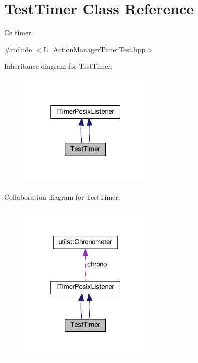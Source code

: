 \hypertarget{classTestTimer}{}\section{Test\+Timer Class Reference}
\label{classTestTimer}


Ce timer.  




{\ttfamily \#include $<$L\+\_\+\+Action\+Manager\+Timer\+Test.\+hpp$>$}



Inheritance diagram for Test\+Timer\+:
\nopagebreak
\begin{figure}[H]
\begin{center}
\leavevmode
\includegraphics[width=184pt]{classTestTimer__inherit__graph}
\end{center}
\end{figure}


Collaboration diagram for Test\+Timer\+:
\nopagebreak
\begin{figure}[H]
\begin{center}
\leavevmode
\includegraphics[width=184pt]{classTestTimer__coll__graph}
\end{center}
\end{figure}

